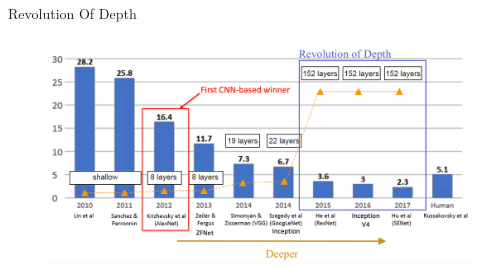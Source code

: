 \documentclass[serif, aspectratio=169]{beamer}
\begin{document}
\begin{frame}{Revolution Of Depth}
	\begin{figure}[htpb]
		\begin{center}
			\includegraphics[keepaspectratio, scale=0.25]{pic/resnet-chart}
		\end{center}
	\end{figure}
\end{frame}
\end{document}
